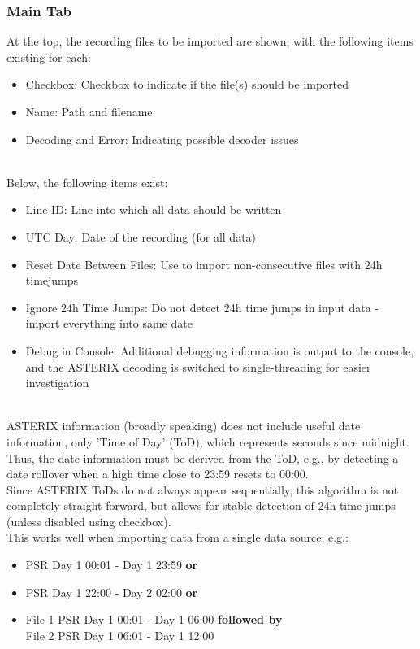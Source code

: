 \subsubsection{Main Tab}

At the top, the recording files to be imported are shown, with the following items existing for each:
\begin{itemize}
\item Checkbox: Checkbox to indicate if the file(s) should be imported
\item Name: Path and filename
\item Decoding and Error: Indicating possible decoder issues
\end{itemize}
\ \\

Below, the following items exist:
\begin{itemize}
\item Line ID: Line into which all data should be written
\item UTC Day: Date of the recording (for all data)
\item Reset Date Between Files: Use to import non-consecutive files with 24h timejumps
\item Ignore 24h Time Jumps: Do not detect 24h time jumps in input data - import everything into same date
\item Debug in Console: Additional debugging information is output to the console, and the ASTERIX decoding is switched to single-threading for easier investigation
\end{itemize}
\ \\

ASTERIX information (broadly speaking) does not include useful date information, only 'Time of Day' (ToD), which represents seconds since midnight. Thus, the date information must be derived from the ToD, e.g., by detecting a date rollover when a high time close to 23:59 resets to 00:00. \\

Since ASTERIX ToDs do not always appear sequentially, this algorithm is not completely straight-forward, but allows for stable detection of 24h time jumps (unless disabled using checkbox). \\

This works well when importing data from a single data source, e.g.:
\begin{itemize}
\item PSR Day 1 00:01 - Day 1 23:59 \textbf{or}
\item PSR Day 1 22:00 - Day 2 02:00 \textbf{or}
\item File 1 PSR Day 1 00:01 - Day 1 06:00 \textbf{followed by} \\{} File 2 PSR Day 1 06:01 - Day 1 12:00
\end{itemize}
\ \\

